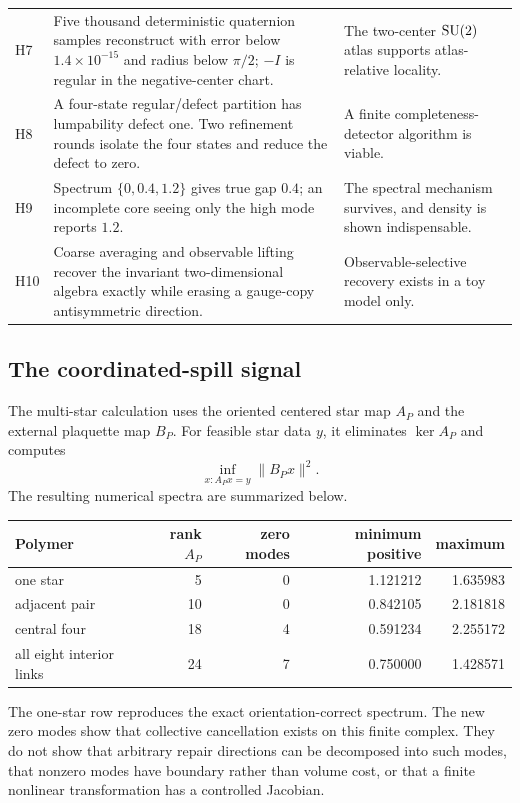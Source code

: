 \begin{longtable}{p{}p{}p{}}
\addlinespace
H7 & Five thousand deterministic quaternion samples reconstruct with error
below \(1.4\times10^{-15}\) and radius below \(\pi/2\); \(-I\) is regular in
the negative-center chart. & The two-center \(\mathrm{SU}(2)\) atlas supports
atlas-relative locality.\\
\addlinespace
H8 & A four-state regular/defect partition has lumpability defect one.  Two
refinement rounds isolate the four states and reduce the defect to zero. & A
finite completeness-detector algorithm is viable.\\
\addlinespace
H9 & Spectrum \(\{0,0.4,1.2\}\) gives true gap \(0.4\); an incomplete core
seeing only the high mode reports \(1.2\). & The spectral mechanism survives,
and density is shown indispensable.\\
\addlinespace
H10 & Coarse averaging and observable lifting recover the invariant
two-dimensional algebra exactly while erasing a gauge-copy antisymmetric
direction. & Observable-selective recovery exists in a toy model only.\\
\bottomrule
\end{longtable}

\subsection{The coordinated-spill signal}

The multi-star calculation uses the oriented centered star map \(A_P\) and
the external plaquette map \(B_P\).  For feasible star data \(y\), it
eliminates \(\ker A_P\) and computes
\begin{equation}
 \inf_{x:A_Px=y}\|B_Px\|^2.
\end{equation}
The resulting numerical spectra are summarized below.

\begin{center}
\begin{tabular}{lrrrr}
\toprule
Polymer & rank \(A_P\) & zero modes & minimum positive & maximum\\
\midrule
one star & 5 & 0 & 1.121212 & 1.635983\\
adjacent pair & 10 & 0 & 0.842105 & 2.181818\\
central four & 18 & 4 & 0.591234 & 2.255172\\
all eight interior links & 24 & 7 & 0.750000 & 1.428571\\
\bottomrule
\end{tabular}
\end{center}

The one-star row reproduces the exact orientation-correct spectrum.  The new
zero modes show that collective cancellation exists on this finite complex.
They do not show that arbitrary repair directions can be decomposed into such
modes, that nonzero modes have boundary rather than volume cost, or that a
finite nonlinear transformation has a controlled Jacobian.

